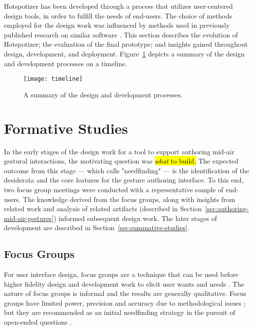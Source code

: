 Hotspotizer has been developed through a process that utilizes user-centered design tools, in order to fulfill the needs of end-users. The choice of methods employed for the design work was influenced by methods used in previously published research on similar software \parencite{Ashbrook:2010, Lu:2012, Lu:2013, Kin:2012, Long:1999, Reis:2012}. This section describes the evolution of Hotspotizer; the evaluation of the final prototype; and insights gained throughout design, development, and deployment. Figure~\ref{fig:timeline} depicts a summary of the design and development processes on a timeline.

\begin{figure}[b]
\centering
\texttt{[image: timeline]}
\caption{A summary of the design and development processes.}
\label{fig:timeline}
\end{figure}

\section{Formative Studies}
\label{sec:formative-studies}

In the early stages of the design work for a tool to support authoring mid-air gestural interactions, the motivating question was \hl{\emph{what} to build.} The expected outcome from this stage --- which \textcite{Klemmer:2014} calls "needfinding" --- is the identification of the desiderata and the core features for the gesture authoring interface. To this end, two focus group meetings were conducted with a representative sample of end-users. The knowledge derived from the focus groups, along with insights from related work and analysis of related artifacts (described in Section~\ref{sec:authoring-mid-air-gestures}) informed subsequent design work. The later stages of development are described in Section~\ref{sec:summative-studies}.

\subsection{Focus Groups}

For user interface design, focus groups are a technique that can be used before higher fidelity design and development work to elicit user wants and needs \parencite{Nielsen:1997}. The nature of focus groups is informal and the results are generally qualitative. Focus groups have limited power, precision and accuracy due to methodological issues \parencite{Smithson:2000, Franz:2011}; but they are recommended as an initial needfinding strategy in the pursuit of open-ended questions \parencite{Nielsen:1997, Kitzinger:1995, Morgan:1996}.


